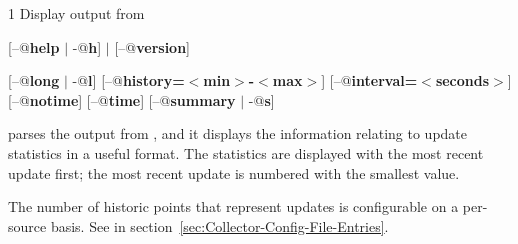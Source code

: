 \begin{ManPage}{\label{man-condor-updates-stats}}{1}
{Display output from }

\Synopsis {}
[\verb@--@\textbf{help} $|$ \verb@-@\textbf{h}] $|$ [\verb@--@\textbf{version}]

[\verb@--@\textbf{long} $|$ \verb@-@\textbf{l}]
[\verb@--@\textbf{history=$<$min$>$-$<$max$>$}]
[\verb@--@\textbf{interval=$<$seconds$>$}]
[\verb@--@\textbf{notime}]
[\verb@--@\textbf{time}]
[\verb@--@\textbf{summary} $|$ \verb@-@\textbf{s}]






\Description 

 parses the output from ,
and it displays the information relating to update statistics
in a useful format.
The statistics are displayed with the most recent update first;
the most recent update is numbered with the smallest value.

The number of historic points that represent updates is
configurable on a per-source basis.
See  in
section~\ref{sec:Collector-Config-File-Entries}.


\end{ManPage}
